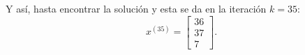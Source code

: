 \begin{frame}
\begin{solution}
\begin{enumerate}[b)]
			      Y así, hasta encontrar la solución y esta se da en la
			      iteración
			      $k=35$:
			      \begin{equation*}
				      x^{\left(35\right)}=
				      \begin{bmatrix}
					      36 \\
					      37 \\
					      7
				      \end{bmatrix}.
			      \end{equation*}
		\end{enumerate}
	\end{solution}
\end{frame}

\begin{frame}[fragile]
	\begin{columns}
		\begin{column}{0.48\textwidth}
			\inputminted[fontsize=\tiny,firstline=1,lastline=24]{python}{p4_steepest.py}
		\end{column}
		\begin{column}{0.48\textwidth}
			\inputminted[fontsize=\tiny,firstline=27,lastline=52]{python}{p4_steepest.py}
		\end{column}
	\end{columns}
\end{frame}

\begin{frame}[fragile]
	\begin{columns}
		\begin{column}{0.48\textwidth}
			\inputminted[fontsize=\tiny,firstline=1,lastline=39]{text}{p4_steepest.txt}
		\end{column}
		\begin{column}{0.48\textwidth}
			\inputminted[fontsize=\tiny,firstline=40,lastline=78]{text}{p4_steepest.txt}
		\end{column}
	\end{columns}
\end{frame}

\begin{frame}[fragile]
	\begin{columns}
		\begin{column}{0.48\textwidth}
			\inputminted[fontsize=\tiny,firstline=80,lastline=118]{text}{p4_steepest.txt}
		\end{column}
		\begin{column}{0.48\textwidth}
			\inputminted[fontsize=\tiny,firstline=120,lastline=158]{text}{p4_steepest.txt}
		\end{column}
	\end{columns}
\end{frame}